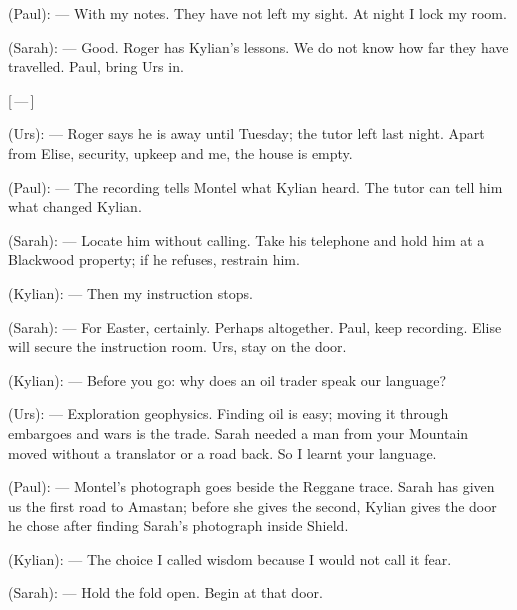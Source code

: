 \begin{room}
(Paul): --- With my notes. They have not left my sight. At night I lock my room.

(Sarah): --- Good. Roger has Kylian's lessons. We do not know how far they have travelled. Paul, bring Urs in.

\centerline{[\,---\,]}

(Urs): --- Roger says he is away until Tuesday; the tutor left last night. Apart from Elise, security, upkeep and me, the house is empty.

(Paul): --- The recording tells Montel what Kylian heard. The tutor can tell him what changed Kylian.

(Sarah): --- Locate him without calling. Take his telephone and hold him at a Blackwood property; if he refuses, restrain him.

(Kylian): --- Then my instruction stops.

(Sarah): --- For Easter, certainly. Perhaps altogether. Paul, keep recording. Elise will secure the instruction room. Urs, stay on the door.

(Kylian): --- Before you go: why does an oil trader speak our language?

(Urs): --- Exploration geophysics. Finding oil is easy; moving it through embargoes and wars is the trade. Sarah needed a man from your Mountain moved without a translator or a road back. So I learnt your language.

(Paul): --- Montel's photograph goes beside the Reggane trace. Sarah has given us the first road to Amastan; before she gives the second, Kylian gives the door he chose after finding Sarah's photograph inside Shield.

(Kylian): --- The choice I called wisdom because I would not call it fear.

(Sarah): --- Hold the fold open. Begin at that door.

\end{room}
